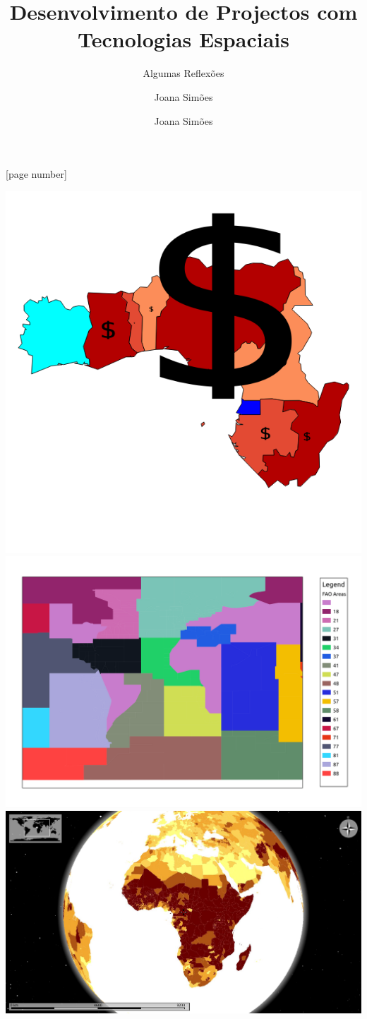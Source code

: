 \documentclass[hyperref={pdfpagelabels=true}]{beamer}
\title{Desenvolvimento de Projectos com Tecnologias Espaciais}
\subtitle{Algumas Reflex\~{o}es}
\author{Joana Sim\~{o}es}
\author[shortname]{Joana Sim\~{o}es \inst{1}}
\institute[shortinst]{\inst{1} e-GEO, CASA}
\begin{document}
[page number]
\begin{frame}

\begin{titlepage}
  \includegraphics[height=.15\textheight]{head.png}
\includegraphics[height=.15\textheight]{head10.png}
  \includegraphics[height=.15\textheight]{head4.png}

\end{titlepage}
\end{frame}
\end{document}
